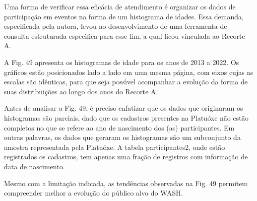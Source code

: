 \documentclass[
12pt,		%
openright,	%
twoside,  %
a4paper,			%
chapter=TITLE,		%
english,			%
french,				%
spanish,			%
brazil				%
]{USPSC-classe/USPSC}
\begin{document}
Uma forma de verificar essa efic\'acia de atendimento \'e organizar os dados de participa\c{c}\~ao em eventos na forma de um histograma de idades. Essa demanda, especificada pela autora, levou ao desenvolvimento de uma ferramenta de consulta estruturada espec\'{\i}fica para esse fim, a qual ficou vinculada ao Recorte A.

















A Fig. 49 apresenta os histogramas de idade para os anos de 2013 a 2022. Os gr\'aficos est\~ao posicionados lado a lado em uma mesma p\'agina, com eixos cujas as escalas s\~ao id\^enticas, para que seja poss\'{\i}vel acompanhar a evolu\c{c}\~ao da forma de suas distribui\c{c}\~oes ao longo dos anos do Recorte A.

















Antes de analisar a Fig. 49, \'e preciso enfatizar que os dados que originaram os histogramas s\~ao parciais, dado que os cadastros presentes na Platu\'oxe n\~ao est\~ao completos no que se refere ao ano de nascimento dos (as) participantes. Em outras palavras, os dados que geraram os histogramas s\~ao um subconjunto da amostra representada pela Platu\'oxe. A tabela participantes2, onde est\~ao registrados os cadastros, tem apenas uma fra\c{c}\~ao de registros com informa\c{c}\~ao de data de nascimento.

















Mesmo com a limita\c{c}\~ao indicada, as tend\^encias observadas na Fig. 49 permitem compreender melhor a evolu\c{c}\~ao do p\'ublico alvo do WASH.
\end{document}
